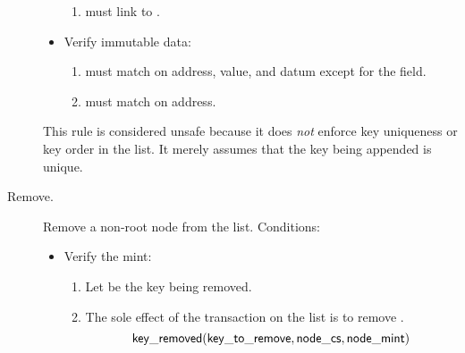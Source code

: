 \documentclass[../midgard.tex]{subfiles}
\begin{document}
\begin{description}
\begin{itemize}
\begin{enumerate}[resume]
                \item {} must link to .
            \end{enumerate}
            
            \item Verify immutable data:
            \begin{enumerate}[resume]
                \item {} must match  on address, value, and datum except for the  field.
                \item {} must match  on address.
            \end{enumerate}
        \end{itemize}

    This rule is considered unsafe because it does \emph{not} enforce key uniqueness or key order in the list.
    It merely assumes that the key being appended is unique.

    \unorderedListWarning 

    \item[Remove.] Remove a non-root node from the list.
      Conditions:
        \begin{itemize}
            \item Verify the mint:
            \begin{enumerate}
                \item Let  be the key being removed.
                \item The sole effect of the transaction on the list is to remove .
                    \begin{equation*}
                        \mathsf{key\_removed}(\mathsf{key\_to\_remove}, \mathsf{node\_cs}, \mathsf{node\_mint})
                    \end{equation*}
            \end{enumerate}
            

\end{itemize}
\end{description}
\end{document}
